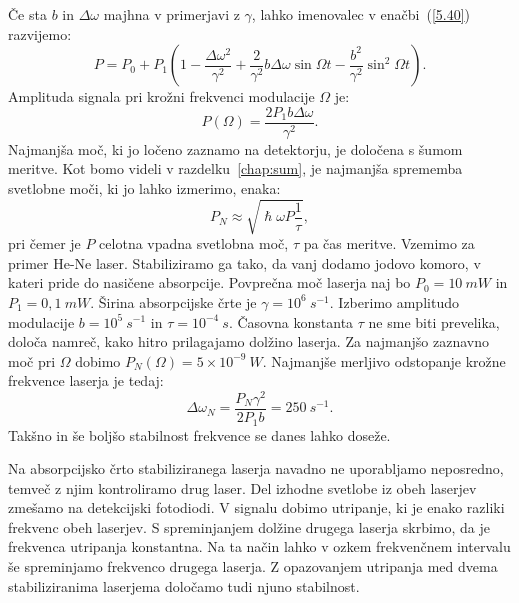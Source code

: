 Če sta $b$ in $\Delta\omega$ majhna v
primerjavi z $\gamma$, lahko imenovalec v enačbi~(\ref{5.40})
razvijemo:
\begin{equation}  
\label{5.42}
P=P_0+P_1 \left(1-\frac{\Delta\omega^2}{\gamma^2} +\frac{2}{\gamma^2} b
\Delta\omega \sin\Omega t - \frac{b^2}{\gamma^2}\sin^2\Omega t\right)\!\!.
\end{equation}
Amplituda signala pri krožni frekvenci modulacije $\Omega$ je:
\begin{equation}
P(\Omega) = \frac{2P_1 b \Delta\omega}{\gamma^2}. 
\end{equation}
Najmanjša moč, ki jo ločeno zaznamo na detektorju, je določena s šumom 
meritve. Kot bomo videli v razdelku~\ref{chap:sum}, je najmanjša 
sprememba svetlobne moči, ki jo lahko izmerimo, enaka:
\begin{equation}  
\label{5.43}
P_N\approx \sqrt{\hslash\omega P \frac{1}{\tau}},
\end{equation}
pri čemer je $P$ celotna vpadna svetlobna moč, $\tau$ pa čas
meritve. Vzemimo za primer He-Ne laser. Stabiliziramo ga tako,
da vanj dodamo jodovo komoro, v kateri pride do nasičene absorpcije.
Povprečna moč laserja naj bo $P_0 = 10~\si{mW}$ in $P_1= 0,1~\si{mW}$. 
Širina absorpcijske črte je $\gamma= 10^6~\si{s}^{-1}$. Izberimo amplitudo 
modulacije $b=10^5~\si{s}^{-1}$ in $\tau=10^{-4}~\si{s}$. Časovna konstanta 
$\tau$ ne sme biti prevelika, določa namreč, kako hitro prilagajamo dolžino 
laserja. Za najmanjšo zaznavno moč pri $\Omega$ dobimo 
$P_N(\Omega) = 5\times10^{-9}~\si{W}$.
Najmanjše merljivo odstopanje krožne frekvence laserja je tedaj: 
\begin{equation}  
\label{5.44}
\Delta\omega_N=\frac{P_N \gamma^2}{2P_1 b}=250~\si{s}^{-1}.
\end{equation}
Takšno in še boljšo stabilnost frekvence se danes lahko doseže. 

\begin{remark}
Na absorpcijsko črto stabiliziranega laserja navadno ne uporabljamo
neposredno, temveč z njim kontroliramo drug laser. Del izhodne svetlobe iz
obeh laserjev zmešamo na detekcijski fotodiodi. V signalu dobimo utripanje,
ki je enako razliki frekvenc obeh laserjev. S spreminjanjem dolžine drugega
laserja skrbimo, da je frekvenca utripanja konstantna. Na ta način lahko v
ozkem frekvenčnem intervalu še spreminjamo frekvenco drugega laserja.
Z opazovanjem utripanja med dvema stabiliziranima laserjema določamo tudi
njuno stabilnost.
\end{remark}

